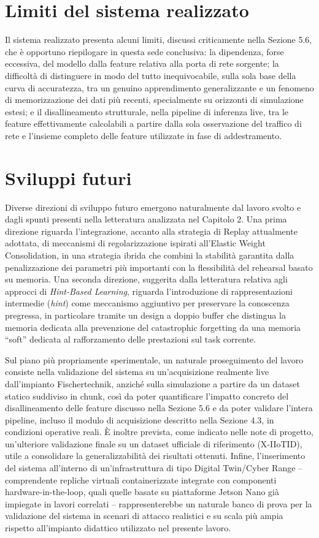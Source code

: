 \documentclass[12pt,a4paper]{report}
\begin{document}
\section{Limiti del sistema realizzato}

Il sistema realizzato presenta alcuni limiti, discussi criticamente nella Sezione 5.6, che è opportuno riepilogare in questa sede conclusiva: la dipendenza, forse eccessiva, del modello dalla feature relativa alla porta di rete sorgente; la difficoltà di distinguere in modo del tutto inequivocabile, sulla sola base della curva di accuratezza, tra un genuino apprendimento generalizzante e un fenomeno di memorizzazione dei dati più recenti, specialmente su orizzonti di simulazione estesi; e il disallineamento strutturale, nella pipeline di inferenza live, tra le feature effettivamente calcolabili a partire dalla sola osservazione del traffico di rete e l'insieme completo delle feature utilizzate in fase di addestramento.

\section{Sviluppi futuri}

Diverse direzioni di sviluppo futuro emergono naturalmente dal lavoro svolto e dagli spunti presenti nella letteratura analizzata nel Capitolo 2. Una prima direzione riguarda l'integrazione, accanto alla strategia di Replay attualmente adottata, di meccanismi di regolarizzazione ispirati all'Elastic Weight Consolidation, in una strategia ibrida che combini la stabilità garantita dalla penalizzazione dei parametri più importanti con la flessibilità del rehearsal basato su memoria. Una seconda direzione, suggerita dalla letteratura relativa agli approcci di \emph{Hint-Based Learning}, riguarda l'introduzione di rappresentazioni intermedie (\emph{hint}) come meccanismo aggiuntivo per preservare la conoscenza pregressa, in particolare tramite un design a doppio buffer che distingua la memoria dedicata alla prevenzione del catastrophic forgetting da una memoria ``soft'' dedicata al rafforzamento delle prestazioni sul task corrente.

Sul piano più propriamente sperimentale, un naturale proseguimento del lavoro consiste nella validazione del sistema su un'acquisizione realmente live dall'impianto Fischertechnik, anziché sulla simulazione a partire da un dataset statico suddiviso in chunk, così da poter quantificare l'impatto concreto del disallineamento delle feature discusso nella Sezione 5.6 e da poter validare l'intera pipeline, incluso il modulo di acquisizione descritto nella Sezione 4.3, in condizioni operative reali. È inoltre prevista, come indicato nelle note di progetto, un'ulteriore validazione finale su un dataset ufficiale di riferimento (X-IIoTID), utile a consolidare la generalizzabilità dei risultati ottenuti. Infine, l'inserimento del sistema all'interno di un'infrastruttura di tipo Digital Twin/Cyber Range -- comprendente repliche virtuali containerizzate integrate con componenti hardware-in-the-loop, quali quelle basate su piattaforme Jetson Nano già impiegate in lavori correlati -- rappresenterebbe un naturale banco di prova per la validazione del sistema in scenari di attacco realistici e su scala più ampia rispetto all'impianto didattico utilizzato nel presente lavoro.
\end{document}
